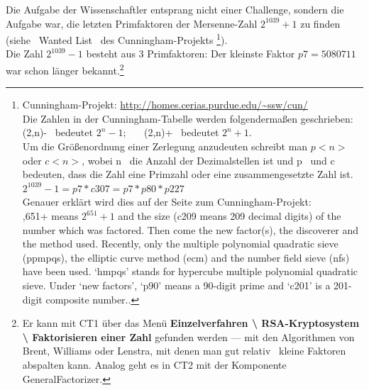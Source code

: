 \begin{refsegment}
Die Aufgabe der Wissenschaftler entsprang nicht einer Challenge, sondern
die Aufgabe war, die letzten Primfaktoren der Mersenne-Zahl $2^{1039}+1$
zu finden (siehe~ \glqq Wanted List\grqq~ des Cunningham-Projekts%
\footnote{%
Cunningham-Projekt: \url{http://homes.cerias.purdue.edu/~ssw/cun/}\\
Die Zahlen in der Cunningham-Tabelle werden folgendermaßen geschrieben:\\
\glqq (2,n)-\grqq~ bedeutet $2^{n}-1$;~~~
\glqq (2,n)+\grqq~ bedeutet $2^{n}+1$.\\
Um die Größenordnung einer Zerlegung anzudeuten schreibt man $p<n>$ oder $c<n>$,
wobei \glqq n\grqq~ die Anzahl der Dezimalstellen ist und \glqq p\grqq~ und \glqq c\grqq~
bedeuten, dass die Zahl eine Primzahl oder eine zusammengesetzte Zahl ist.\\
$2^{1039}-1 = p7 * c307 = p7 * p80 * p227$\\
Genauer erklärt wird dies auf der Seite zum Cunningham-Projekt:\\
,651+ means $2^{651} + 1$ and the size (c209 means 209 decimal digits)
of the
number which was factored.  Then come the new factor(s), the discoverer and
the method used.  Recently, only the multiple polynomial quadratic sieve
(ppmpqs), the elliptic curve method (ecm) and the number field sieve (nfs)
have been used.  `hmpqs' stands for hypercube multiple polynomial quadratic
sieve.  Under `new factors', `p90' means a 90-digit prime and `c201' is a
201-digit composite number.\grqq.
}).\\


Die Zahl $2^{1039}-1$ besteht aus 3 Primfaktoren: Der kleinste Faktor
$p7 = 5080711$ war schon länger bekannt.\footnote{%
  Er kann mit CT1 über das Menü
  \textbf{Einzelverfahren \textbackslash{} RSA-Kryptosystem \textbackslash{}
  Faktorisieren einer Zahl} gefunden werden --- mit den Algorithmen von Brent,
  Williams oder Lenstra, mit denen man gut \glqq relativ\grqq~ kleine Faktoren
  abspalten kann. Analog geht es in CT2 mit der Komponente
  GeneralFactorizer.
}


\end{refsegment}
